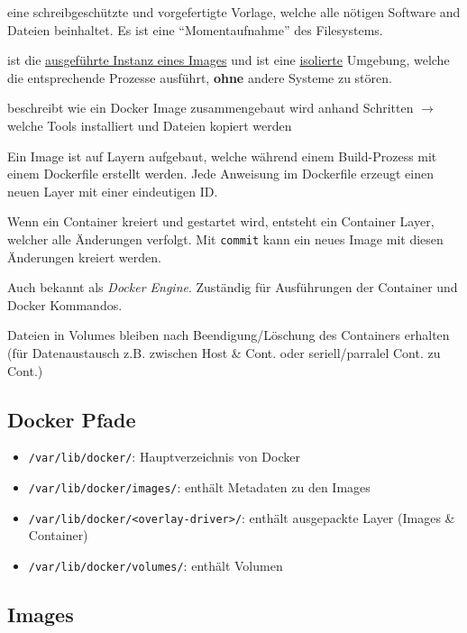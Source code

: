 \documentclass[
  10pt,
  a4paper,
  twocolumn]{article}
\providecommand{\tightlist}{%
  \setlength{\itemsep}{0pt}\setlength{\parskip}{0pt}}\usepackage{longtable,booktabs,array}
\begin{document}
\begin{description}
\tightlist
\item[Image]
eine schreibgeschützte und vorgefertigte Vorlage, welche alle nötigen
Software and Dateien beinhaltet. Es ist eine ``Momentaufnahme'' des
Filesystems.
\item[Container]
ist die \ul{ausgeführte Instanz eines Images} und ist eine
\ul{isolierte} Umgebung, welche die entsprechende Prozesse ausführt,
\textbf{ohne} andere Systeme zu stören.
\item[Dockerfile]
beschreibt wie ein Docker Image zusammengebaut wird anhand Schritten
\(\rightarrow\) welche Tools installiert und Dateien kopiert werden
\item[Layers]
Ein Image ist auf Layern aufgebaut, welche während einem Build-Prozess
mit einem Dockerfile erstellt werden. Jede Anweisung im Dockerfile
erzeugt einen neuen Layer mit einer eindeutigen ID.
\item[Container Layer]
Wenn ein Container kreiert und gestartet wird, entsteht ein Container
Layer, welcher alle Änderungen verfolgt. Mit \texttt{commit} kann ein
neues Image mit diesen Änderungen kreiert werden.
\item[Docker daemon \texttt{dockerd} (Service)]
Auch bekannt als \emph{Docker Engine}. Zuständig für Ausführungen der
Container und Docker Kommandos.
\item[Volumes]
Dateien in Volumes bleiben nach Beendigung/Löschung des Containers
erhalten (für Datenaustausch z.B. zwischen Host \& Cont. oder
seriell/parralel Cont. zu Cont.)
\end{description}

\subsection{Docker Pfade}\label{docker-pfade}

\begin{itemize}
\tightlist
\item
  \texttt{/var/lib/docker/}: Hauptverzeichnis von Docker
\item
  \texttt{/var/lib/docker/images/}: enthält Metadaten zu den Images
\item
  \texttt{/var/lib/docker/\textless{}overlay-driver\textgreater{}/}:
  enthält ausgepackte Layer (Images \& Container)
\item
  \texttt{/var/lib/docker/volumes/}: enthält Volumen
\end{itemize}

\subsection{Images}\label{images}
\end{document}
